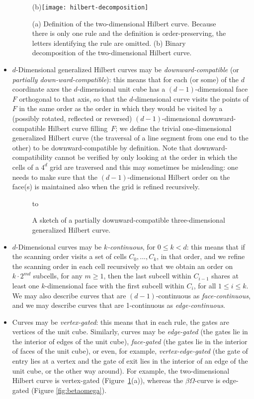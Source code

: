 \documentclass[11pt,a4paper]{article}
\begin{document}
\begin{itemize}
\begin{figure}
{(b)\texttt{[image: hilbert-decomposition]}\hfill
}
\caption{(a) Definition of the two-dimensional Hilbert curve. Because there is only one rule and the definition is order-preserving, the letters identifying the rule are omitted. (b) Binary decomposition of the two-dimensional Hilbert curve.}
\label{fig:decomposable}\label{fig:vertexgated}
\end{figure}
\item $d$-Dimensional generalized Hilbert curves may be \emph{downward-compatible} (or \emph{partially down-ward-compatible}): this means that for each (or some) of the $d$ coordinate axes the $d$-dimensional unit cube has a $(d-1)$-dimensional face $F$ orthogonal to that axis, so that the $d$-dimensional curve visits the points of $F$ in the same order as the order in which they would be visited by a (possibly rotated, reflected or reversed) $(d-1)$-dimensional downward-compatible Hilbert curve filling~$F$; we define the trivial one-dimensional generalized Hilbert curve (the traversal of a line segment from one end to the other) to be downward-compatible by definition.
    Note that downward-compatibility cannot be verified by only looking at the order in which the cells of a $4^d$ grid are traversed and this may sometimes be misleading: one needs to make sure that the $(d-1)$-dimensional Hilbert order on the face(s) is maintained also when the grid is refined recursively.
\begin{figure}
\centering
\hbox to 
\caption{A sketch of a partially downward-compatible three-dimensional generalized Hilbert curve.}
\label{fig:compatible}
\end{figure}
\item $d$-Dimensional curves may be \emph{$k$-continuous}, for $0 \leq k < d$: this means that if the scanning order visits a set of cells $C_0,...,C_k$, in that order, and we refine the scanning order in each cell recursively so that we obtain an order on $k \cdot 2^{md}$ subcells, for any $m \geq 1$, then the last subcell within $C_{i-1}$ shares at least one $k$-dimensional face with the first subcell within $C_i$, for all $1 \leq i \leq k$. We may also describe curves that are $(d-1)$-continuous as \emph{face-continuous}, and we may describe curves that are 1-continuous as \emph{edge-continuous}.
\item Curves may be \emph{vertex-gated}: this means that in each rule, the gates are vertices of the unit cube. Similarly, curves may be \emph{edge-gated} (the gates lie in the interior of edges of the unit cube), \emph{face-gated} (the gates lie in the interior of faces of the unit cube), or even, for example, \emph{vertex-edge-gated} (the gate of entry lies at a vertex and the gate of exit lies in the interior of an edge of the unit cube, or the other way around). For example, the two-dimensional Hilbert curve is vertex-gated (Figure~\ref{fig:vertexgated}(a)), whereas the $\beta\Omega$-curve is edge-gated (Figure \ref{fig:betaomega}).

\end{itemize}
\end{document}
